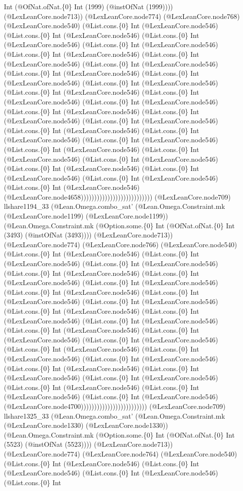 \documentclass[11pt]{article}
\begin{document}
Int (@OfNat.ofNat.\{0\} Int (1999) (@instOfNat (1999)))) (@LexLeanCore.node713)) (@LexLeanCore.node774) (@LexLeanCore.node768) (@LexLeanCore.node540) (@List.cons.\{0\} Int (@LexLeanCore.node546) (@List.cons.\{0\} Int (@LexLeanCore.node546) (@List.cons.\{0\} Int (@LexLeanCore.node546) (@List.cons.\{0\} Int (@LexLeanCore.node546) (@List.cons.\{0\} Int (@LexLeanCore.node546) (@List.cons.\{0\} Int (@LexLeanCore.node546) (@List.cons.\{0\} Int (@LexLeanCore.node546) (@List.cons.\{0\} Int (@LexLeanCore.node546) (@List.cons.\{0\} Int (@LexLeanCore.node546) (@List.cons.\{0\} Int (@LexLeanCore.node546) (@List.cons.\{0\} Int (@LexLeanCore.node546) (@List.cons.\{0\} Int (@LexLeanCore.node546) (@List.cons.\{0\} Int (@LexLeanCore.node546) (@List.cons.\{0\} Int (@LexLeanCore.node546) (@List.cons.\{0\} Int (@LexLeanCore.node546) (@List.cons.\{0\} Int (@LexLeanCore.node546) (@List.cons.\{0\} Int (@LexLeanCore.node546) (@List.cons.\{0\} Int (@LexLeanCore.node546) (@List.cons.\{0\} Int (@LexLeanCore.node546) (@List.cons.\{0\} Int (@LexLeanCore.node546) (@List.cons.\{0\} Int (@LexLeanCore.node546) (@List.cons.\{0\} Int (@LexLeanCore.node546) (@List.cons.\{0\} Int (@LexLeanCore.node546) (@List.cons.\{0\} Int (@LexLeanCore.node546) (@List.cons.\{0\} Int (@LexLeanCore.node546) (@List.cons.\{0\} Int (@LexLeanCore.node546) (@LexLeanCore.node4658))))))))))))))))))))))))))) (@LexLeanCore.node709) llshare1194\_33 (@Lean.Omega.combo\_sat' (@Lean.Omega.Constraint.mk (@LexLeanCore.node1199) (@LexLeanCore.node1199)) (@Lean.Omega.Constraint.mk (@Option.some.\{0\} Int (@OfNat.ofNat.\{0\} Int (3493) (@instOfNat (3493)))) (@LexLeanCore.node713)) (@LexLeanCore.node774) (@LexLeanCore.node766) (@LexLeanCore.node540) (@List.cons.\{0\} Int (@LexLeanCore.node546) (@List.cons.\{0\} Int (@LexLeanCore.node546) (@List.cons.\{0\} Int (@LexLeanCore.node546) (@List.cons.\{0\} Int (@LexLeanCore.node546) (@List.cons.\{0\} Int (@LexLeanCore.node546) (@List.cons.\{0\} Int (@LexLeanCore.node546) (@List.cons.\{0\} Int (@LexLeanCore.node546) (@List.cons.\{0\} Int (@LexLeanCore.node546) (@List.cons.\{0\} Int (@LexLeanCore.node546) (@List.cons.\{0\} Int (@LexLeanCore.node546) (@List.cons.\{0\} Int (@LexLeanCore.node546) (@List.cons.\{0\} Int (@LexLeanCore.node546) (@List.cons.\{0\} Int (@LexLeanCore.node546) (@List.cons.\{0\} Int (@LexLeanCore.node546) (@List.cons.\{0\} Int (@LexLeanCore.node546) (@List.cons.\{0\} Int (@LexLeanCore.node546) (@List.cons.\{0\} Int (@LexLeanCore.node546) (@List.cons.\{0\} Int (@LexLeanCore.node546) (@List.cons.\{0\} Int (@LexLeanCore.node546) (@List.cons.\{0\} Int (@LexLeanCore.node546) (@List.cons.\{0\} Int (@LexLeanCore.node546) (@List.cons.\{0\} Int (@LexLeanCore.node546) (@List.cons.\{0\} Int (@LexLeanCore.node546) (@List.cons.\{0\} Int (@LexLeanCore.node546) (@LexLeanCore.node4700))))))))))))))))))))))))) (@LexLeanCore.node709) llshare1325\_33 (@Lean.Omega.combo\_sat' (@Lean.Omega.Constraint.mk (@LexLeanCore.node1330) (@LexLeanCore.node1330)) (@Lean.Omega.Constraint.mk (@Option.some.\{0\} Int (@OfNat.ofNat.\{0\} Int (5523) (@instOfNat (5523)))) (@LexLeanCore.node713)) (@LexLeanCore.node774) (@LexLeanCore.node764) (@LexLeanCore.node540) (@List.cons.\{0\} Int (@LexLeanCore.node546) (@List.cons.\{0\} Int (@LexLeanCore.node546) (@List.cons.\{0\} Int (@LexLeanCore.node546) (@List.cons.\{0\} Int 
\end{document}
